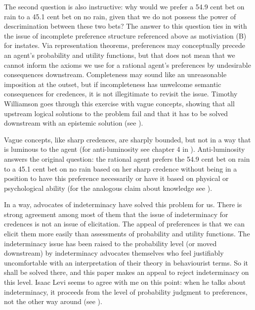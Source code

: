 \documentclass[11pt]{article}
\begin{document}
The second question is also instructive: why would we prefer a 54.9
cent bet on rain to a 45.1 cent bet on no rain, given that we do not
possess the power of descrimination between these two bets? The answer
to this question ties in with the issue of incomplete preference
structure referenced above as motiviation (B) for instates. Via
representation theorems, preferences may conceptually precede an
agent's probability and utility functions, but that does not mean that
we cannot inform the axioms we use for a rational agent's preferences
by undesirable consequences downstream. Completeness may sound like an
unreasonable imposition at the outset, but if incompleteness has
unwelcome semantic consequences for credences, it is not illegitimate
to revisit the issue. Timothy Williamson goes through this exercise
with vague concepts, showing that all upstream logical solutions to
the problem fail and that it has to be solved downstream with an
epistemic solution (see ).

Vague concepts, like sharp credences, are sharply bounded, but not in
a way that is luminous to the agent (for anti-luminosity see chapter 4
in ). Anti-luminosity answers the original
question: the rational agent prefers the 54.9 cent bet on rain to a
45.1 cent bet on no rain based on her sharp credence without being in
a position to have this preference necessarily or have it based on
physical or psychological ability (for the analogous claim about
knowledge see ).

In a way, advocates of indeterminacy have solved this problem for us.
There is strong agreement among most of them that the issue of
indeterminacy for credences is not an issue of elicitation. The appeal
of preferences is that we can elicit them more easily than assessments
of probability and utility functions. The indeterminacy issue has been
raised to the probability level (or moved downstream) by indeterminacy
advocates themselves who feel justifiably uncomfortable with an
interpretation of their theory in behaviourist terms. So it shall be
solved there, and this paper makes an appeal to reject indeterminacy
on this level. Isaac Levi seems to agree with me on this point: when
he talks about indeterminacy, it proceeds from the level of
probability judgment to preferences, not the other way around (see
).

\end{document}
